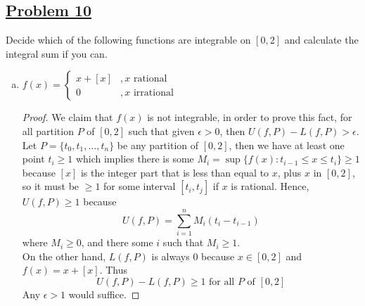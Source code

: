 \documentclass[10pt,letterpaper]{article}
\begin{document}
	\subsection*{{\color{purple}\underline{Problem 10}}}
	Decide which of the following functions are integrable on $[0, 2]$ and calculate the integral
	sum if you can.
	\begin{enumerate}[(a)]
		\item 
		$f(x) = 
		\begin{cases}
			x + [x] &, x \text{ rational } \\
			0 &, x \text{ irrational } 
		\end{cases}
		$
		\begin{proof}
		We claim that $f(x)$ is not integrable, in order to prove this fact, for all partition $P$ of $[0, 2]$ such that
		given $\epsilon > 0$, then $U(f,P) - L(f, P) > \epsilon$. \\
		Let $P = \{t_0, t_1, \ldots, t_n\}$ be any partition of $[0, 2]$, then we have at least one point $t_i \geq 1$
		which implies there is some $M_i = \sup\{f(x): t_{i-1} \leq x \leq t_i\} \geq 1$ because $[x]$ is the integer
		part that is less than equal to $x$, plus $x$ in $[0, 2]$, so it must be $\geq 1$ for some interval $[t_i, t_j]$ if 
		$x$ is rational. Hence, $U(f, P) \geq 1$ because 
		$$U(f, P) = \displaystyle\sum_{i=1}^{n} M_i(t_i - t_{i-1})$$ 
		where $M_i \geq 0$, and there some $i$ such that $M_i \geq 1$. \\
		On the other hand, $L(f, P)$ is always $0$ because $x \in [0, 2]$ and $f(x) = x + [x]$. Thus
		$$U(f, P) - L(f, P) \geq 1 \text{ for all } P \text{ of } [0, 2]$$
		Any $\epsilon > 1$ would suffice.
		\end{proof}
		

\end{enumerate}
\end{document}

